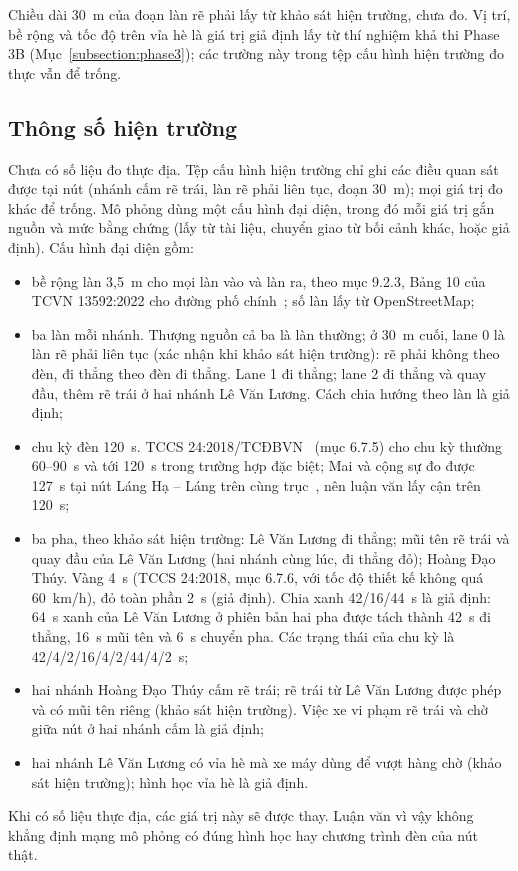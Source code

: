 \documentclass[../DoAn.tex]{subfiles}
\begin{document}
Chiều dài 30~m của đoạn làn rẽ phải lấy từ khảo sát hiện trường, chưa đo. Vị trí, bề rộng và tốc độ trên vỉa hè là giá trị giả định lấy từ thí nghiệm khả thi Phase 3B (Mục~\ref{subsection:phase3}); các trường này trong tệp cấu hình hiện trường đo thực vẫn để trống.

\subsection{Thông số hiện trường}

Chưa có số liệu đo thực địa. Tệp cấu hình hiện trường chỉ ghi các điều quan sát được tại nút (nhánh cấm rẽ trái, làn rẽ phải liên tục, đoạn 30~m); mọi giá trị đo khác để trống. Mô phỏng dùng một cấu hình đại diện, trong đó mỗi giá trị gắn nguồn và mức bằng chứng (lấy từ tài liệu, chuyển giao từ bối cảnh khác, hoặc giả định). Cấu hình đại diện gồm:
\begin{itemize}
    \item bề rộng làn 3,5~m cho mọi làn vào và làn ra, theo mục 9.2.3, Bảng 10 của TCVN 13592:2022 cho đường phố chính~\cite{tcvn13592}; số làn lấy từ OpenStreetMap;
    \item ba làn mỗi nhánh. Thượng nguồn cả ba là làn thường; ở 30~m cuối, lane 0 là làn rẽ phải liên tục (xác nhận khi khảo sát hiện trường): rẽ phải không theo đèn, đi thẳng theo đèn đi thẳng. Lane 1 đi thẳng; lane 2 đi thẳng và quay đầu, thêm rẽ trái ở hai nhánh Lê Văn Lương. Cách chia hướng theo làn là giả định;
    \item chu kỳ đèn 120~s. TCCS 24:2018/TCĐBVN~\cite{tccs24_2018} (mục 6.7.5) cho chu kỳ thường 60--90~s và tới 120~s trong trường hợp đặc biệt; Mai và cộng sự đo được 127~s tại nút Láng Hạ -- Láng trên cùng trục~\cite{mai2019signal}, nên luận văn lấy cận trên 120~s;
    \item ba pha, theo khảo sát hiện trường: Lê Văn Lương đi thẳng; mũi tên rẽ trái và quay đầu của Lê Văn Lương (hai nhánh cùng lúc, đi thẳng đỏ); Hoàng Đạo Thúy. Vàng 4~s (TCCS 24:2018, mục 6.7.6, với tốc độ thiết kế không quá 60~km/h), đỏ toàn phần 2~s (giả định). Chia xanh 42/16/44~s là giả định: 64~s xanh của Lê Văn Lương ở phiên bản hai pha được tách thành 42~s đi thẳng, 16~s mũi tên và 6~s chuyển pha. Các trạng thái của chu kỳ là 42/4/2/16/4/2/44/4/2~s;
    \item hai nhánh Hoàng Đạo Thúy cấm rẽ trái; rẽ trái từ Lê Văn Lương được phép và có mũi tên riêng (khảo sát hiện trường). Việc xe vi phạm rẽ trái và chờ giữa nút ở hai nhánh cấm là giả định;
    \item hai nhánh Lê Văn Lương có vỉa hè mà xe máy dùng để vượt hàng chờ (khảo sát hiện trường); hình học vỉa hè là giả định.
\end{itemize}
Khi có số liệu thực địa, các giá trị này sẽ được thay. Luận văn vì vậy không khẳng định mạng mô phỏng có đúng hình học hay chương trình đèn của nút thật.
\end{document}
